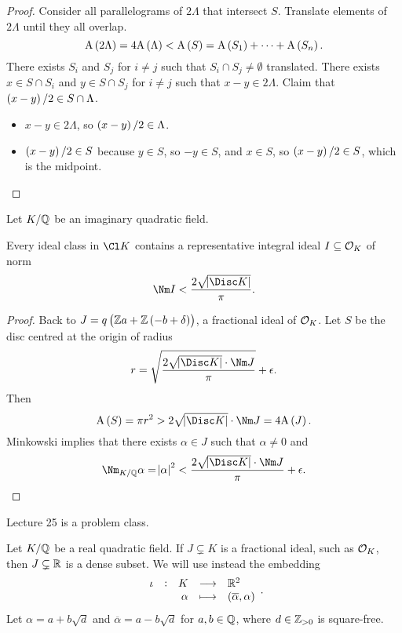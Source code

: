 \begin{proof}
Consider all parallelograms of $ 2\Lambda $ that intersect $ S $. Translate elements of $ 2\Lambda $ until they all overlap.
$$ \A\br{2\Lambda} = 4\A\br{\Lambda} < \A\br{S} = \A\br{S_1} + \dots + \A\br{S_n}. $$
There exists $ S_i $ and $ S_j $ for $ i \ne j $ such that $ S_i \cap S_j \ne \emptyset $ translated. There exists $ x \in S \cap S_i $ and $ y \in S \cap S_j $ for $ i \ne j $ such that $ x - y \in 2\Lambda $. Claim that $ \br{x - y} / 2 \in S \cap \Lambda $.
\begin{itemize}
\item $ x - y \in 2\Lambda $, so $ \br{x - y} / 2 \in \Lambda $.
\item $ \br{x - y} / 2 \in S $ because $ y \in S $, so $ -y \in S $, and $ x \in S $, so $ \br{x - y} / 2 \in S $, which is the midpoint.
\end{itemize}
\end{proof}

Let $ K / \mathbb{Q} $ be an imaginary quadratic field.

\begin{theorem}
Every ideal class in $ \Cl K $ contains a representative integral ideal $ I \subseteq \mathcal{O}_K $ of norm
$$ \Nm I < \dfrac{2\sqrt{\abs{\Disc K}}}{\pi}. $$
\end{theorem}

\begin{proof}
Back to $ J = q\br{\ZZ a + \ZZ\br{-b + \delta}} $, a fractional ideal of $ \mathcal{O}_K $. Let $ S $ be the disc centred at the origin of radius
$$ r = \sqrt{\dfrac{2\sqrt{\abs{\Disc K}} \cdot \Nm J}{\pi}} + \epsilon. $$
Then
$$ \A\br{S} = \pi r^2 > 2\sqrt{\abs{\Disc K}} \cdot \Nm J = 4\A\br{J}. $$
Minkowski implies that there exists $ \alpha \in J $ such that $ \alpha \ne 0 $ and
$$ \Nm_{K / \QQ} \alpha = \abs{\alpha}^2 < \dfrac{2\sqrt{\abs{\Disc K}} \cdot \Nm J}{\pi} + \epsilon. $$
\end{proof}


Lecture 25 is a problem class.

\pagebreak


Let $ K / \mathbb{Q} $ be a real quadratic field. If $ J \subsetneq K $ is a fractional ideal, such as $ \mathcal{O}_K $, then $ J \subsetneq \mathbb{R} $ is a dense subset. We will use instead the embedding
$$ \function[\iota]{K}{\RR^2}{\alpha}{\br{\overline{\alpha}, \alpha}}. $$
Let $ \alpha = a + b\sqrt{d} $ and $ \overline{\alpha} = a - b\sqrt{d} $ for $ a, b \in \mathbb{Q} $, where $ d \in \mathbb{Z}_{> 0} $ is square-free.

